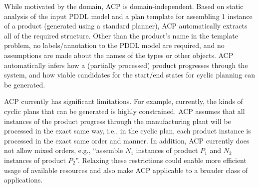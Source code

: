 
While %
motivated by the {\ca} domain, ACP is domain-independent.
Based on static analysis of the
input PDDL model and a plan template for assembling 1 instance
of a product (generated using a standard
\domind planner), ACP automatically extracts all of the
required structure. 
Other than the product's name in the template problem,
no labels/annotation to the PDDL model are required, and
no assumptions are made about the names of the types or other objects.
ACP automatically infers how a (partially processed) product progresses through the
system, and how viable candidates for the start/end states for cyclic planning can be generated.


ACP currently has significant limitations.  For example,
currently, the kinds of cyclic plans that can be generated is highly
constrained.  ACP assumes that all instances of the product progress
through the manufacturing plant will be processed in the exact same
way, i.e., in the cyclic plan, %
each product instance is processed in the exact same order  and manner.
In addition, ACP currently does not allow mixed orders, e.g.,
``assemble $N_1$ instances of product $P_1$ and $N_2$ instances of
product $P_2$''.  Relaxing these restrictions could enable more
efficient usage of available resources and also make ACP applicable to a
broader class of applications. 


